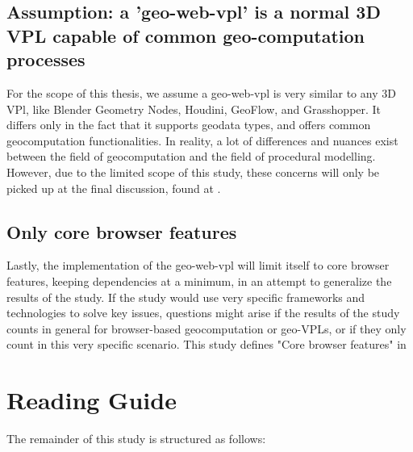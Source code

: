 \subsection*{Assumption: a '\ac{geo-web-vpl}' is a normal 3D VPL capable of common geo-computation processes}
For the scope of this thesis, we assume a \ac{geo-web-vpl} is very similar to any 3D VPl, like Blender Geometry Nodes, Houdini, GeoFlow, and Grasshopper. 
It differs only in the fact that it supports geodata types, and offers common geocomputation functionalities. 
In reality, a lot of differences and nuances exist between the field of geocomputation and the field of procedural modelling. 
However, due to the limited scope of this study, these concerns will only be picked up at the final discussion, found at .
 
\subsection*{Only core browser features}
Lastly, the implementation of the geo-web-vpl will limit itself to core browser features, keeping dependencies at a minimum, in an attempt to generalize the results of the study.
If the study would use very specific frameworks and technologies to solve key issues, questions might arise if the results of the study counts in general for browser-based geocomputation or geo-VPLs, or if they only count in this very specific scenario. 
This study defines "Core browser features" in 

\newpage
\section{Reading Guide}

The remainder of this study is structured as follows:

